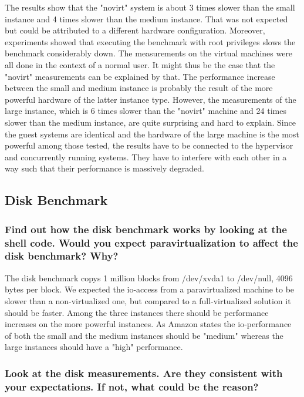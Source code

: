 \documentclass{article}
\begin{document}
The results show that the "novirt" system is about 3 times slower than the small instance and 4 times slower than the medium instance. That was not expected but could be attributed to a different hardware configuration. Moreover, experiments showed that executing the benchmark with root privileges slows the benchmark considerably down. The measurements on the virtual machines were all done in the context of a normal user. It might thus be the case that the "novirt" measurements can be explained by that. The performance increase between the small and medium instance is probably the result of the more powerful hardware of the latter instance type.
However, the measurements of the large instance, which is 6 times slower than the "novirt" machine and 24 times slower than the medium instance, are quite surprising and hard to explain. Since the guest systems are identical and the hardware of the large machine is the most powerful among those tested, the results have to be connected to the hypervisor and concurrently running systems. They have to interfere with each other in a way such that their performance is massively degraded.

\subsection{Disk Benchmark}
	\subsubsection{Find out how the disk benchmark works by looking at the shell code. Would you expect paravirtualization to affect the disk benchmark? Why?}

The disk benchmark copys 1 million blocks from /dev/xvda1 to /dev/null, 4096 bytes per block. We expected the io-access from a paravirtualized machine to be slower than a non-virtualized one, but compared to a full-virtualized solution it should be faster. Among the three instances there should be performance increases on the more powerful instances. As Amazon states the io-performance of both the small and the medium instances should be "medium" whereas the large instances should have a "high" performance.

	\subsubsection{Look at the disk measurements. Are they consistent with your expectations. If not, what could be the reason?}
\end{document}
